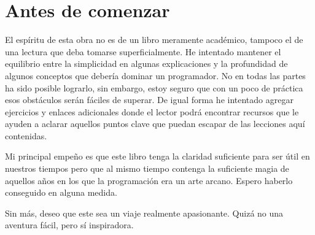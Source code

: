 \thispagestyle{empty}

\chapter{Antes de comenzar}


El espíritu de esta obra no es de un libro meramente académico, tampoco el de una lectura que deba tomarse superficialmente. He intentado mantener el equilibrio entre la simplicidad en algunas explicaciones y la profundidad de algunos conceptos que debería dominar un programador. No en todas las partes ha sido posible lograrlo, sin embargo, estoy seguro que con un poco de práctica esos obstáculos serán fáciles de superar. De igual forma he intentado agregar ejercicios y enlaces adicionales donde el lector podrá encontrar recursos que le ayuden a aclarar aquellos puntos clave que puedan escapar de las lecciones aquí contenidas.

Mi principal empeño es que este libro tenga la claridad suficiente para ser útil en nuestros tiempos pero que al mismo tiempo contenga la suficiente magia de aquellos años en los que la programación era un arte arcano. Espero haberlo conseguido en alguna medida.

Sin más, deseo que este sea un viaje realmente apasionante. Quizá no una aventura fácil, pero sí inspiradora. 



